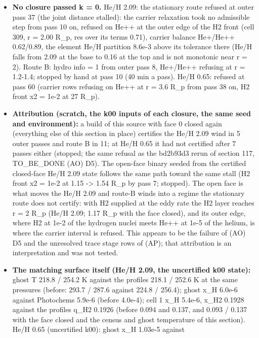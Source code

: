 \documentclass[english,a4paper]{my_memo}
\providecommand{\tightlist}{\setlength{\itemsep}{0pt}\setlength{\parskip}{0pt}}
\begin{document}
\begin{itemize}
\tightlist
\item
  \textbf{No closure passed k = 0.} He/H 2.09: the stationary route refused at
  outer pass 37 (the joint distance stalled): the carrier relaxation took no
  admissible step from pass 10 on, refused on He++ at the outer edge of the
  H2 front (cell 309, r = 2.00 R\_p, \textbar res\textbar{} over its terms 0.71), carrier
  balance He+/He++ 0.62/0.89, the element He/H partition 8.6e-3 above its
  tolerance there (He/H falls from 2.09 at the base to 0.16 at the top and is
  not monotonic near r = 2). Route B: hydro info = 1 from outer pass 8,
  He+/He++ refusing at r = 1.2-1.4; stopped by hand at pass 10 (40 min a
  pass). He/H 0.65: refused at pass 60 (carrier rows refusing on He++ at
  r = 3.6 R\_p from pass 38 on, H2 front x2 = 1e-2 at 27 R\_p).
\item
  \textbf{Attribution (scratch, the k00 inputs of each closure, the same seed and
  environment):} a build of this source with face 0 closed again (everything
  else of this section in place) certifies the He/H 2.09 wind in 5 outer
  passes and route B in 11; at He/H 0.65 it had not certified after 7
  passes either (stopped; the same refusal as the bd2b93d3 rerun of section
  117, TO\_BE\_DONE (AO) D5). The open-face binary seeded from the certified
  closed-face He/H 2.09 state follows the same path toward the same stall
  (H2 front x2 = 1e-2 at 1.15 -\textgreater{} 1.54 R\_p by pass 7; stopped). The open face
  is what moves the He/H 2.09 and route-B winds into a regime the
  stationary route does not certify: with H2 supplied at the eddy rate the
  H2 layer reaches r = 2 R\_p (He/H 2.09; 1.17 R\_p with the face closed), and
  its outer edge, where H2 at 1e-2 of the hydrogen nuclei meets He++ at
  1e-5 of the helium, is where the carrier interval is refused. This appears
  to be the failure of (AO) D5 and the unresolved trace stage rows of (AP);
  that attribution is an interpretation and was not tested.
\item
  \textbf{The matching surface itself (He/H 2.09, the uncertified k00 state):}
  ghost T 218.8 / 254.2 K against the profile\textquotesingle s 218.1 / 252.6 K at the same
  pressures (before: 293.7 / 287.6 against 224.8 / 256.4); ghost x\_H
  6.0e-6 against Photochem\textquotesingle s 5.9e-6 (before 4.0e-4); cell 1 x\_H 5.4e-6, x\_H2
  0.1928 against the profile\textquotesingle s q\_H2 0.1926 (before 0.094 and 0.137, and
  0.093 / 0.137 with the face closed and the census and ghost temperature of
  this section). He/H 0.65 (uncertified k00): ghost x\_H 1.03e-5 against

\end{itemize}
\end{document}
